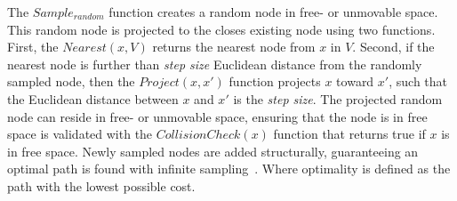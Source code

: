 The $\mathit{Sample_{random}}$ function creates a random node in free- or unmovable space. This random node is projected to the closes existing node using two functions. First, the $\mathit{Nearest}(x, V)$ returns the nearest node from $x$ in $V$. Second, if the nearest node is further than \textit{step size} Euclidean distance from the randomly sampled node, then the $\mathit{Project}(x, x')$ function projects $x$ toward $x'$, such that the Euclidean distance between $x$ and $x'$ is the \textit{step size}. The projected random node can reside in free- or unmovable space, ensuring that the node is in free space is validated with the $\mathit{CollisionCheck}(x)$ function that returns true if $x$ is in free space. Newly sampled nodes are added structurally, guaranteeing an optimal path is found with infinite sampling~\cite{chen_fast_2018}. Where optimality is defined as the path with the lowest possible cost.\bs

